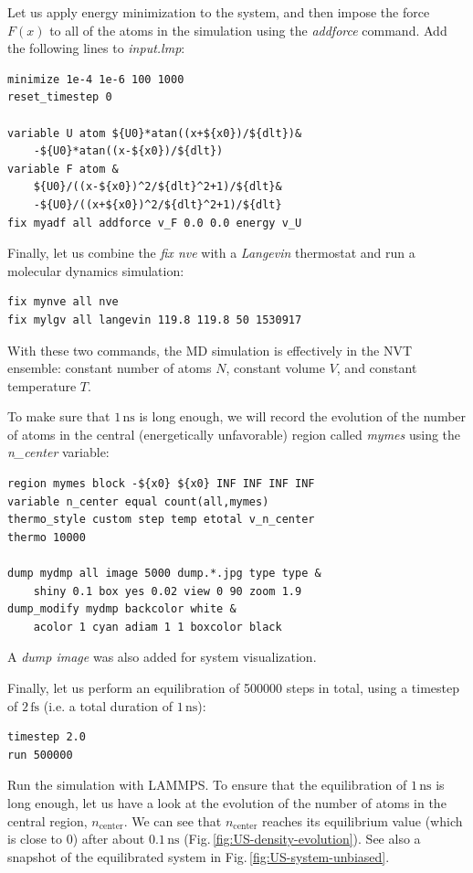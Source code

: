\documentclass[9pt,tutorial]{livecoms}
\begin{document}
Let us apply energy minimization to the system, and then impose the force $F(x)$
to all of the atoms in the simulation using the \textit{addforce} command. Add
the following lines to \textit{input.lmp}:
{\normalsize \begin{verbatim}
minimize 1e-4 1e-6 100 1000
reset_timestep 0

variable U atom ${U0}*atan((x+${x0})/${dlt})&
    -${U0}*atan((x-${x0})/${dlt})
variable F atom &
    ${U0}/((x-${x0})^2/${dlt}^2+1)/${dlt}&
    -${U0}/((x+${x0})^2/${dlt}^2+1)/${dlt}
fix myadf all addforce v_F 0.0 0.0 energy v_U
\end{verbatim}}
Finally, let us combine the \textit{fix nve} with a \textit{Langevin} thermostat
and run a molecular dynamics simulation:
{\normalsize \begin{verbatim}
fix mynve all nve
fix mylgv all langevin 119.8 119.8 50 1530917
\end{verbatim}}
With these two commands, the MD simulation
is effectively in the NVT ensemble: constant number of atoms $N$, constant volume
$V$, and constant temperature $T$.

To make sure that $1\,\text{ns}$ is long enough, we will record the evolution of
the number of atoms in the central (energetically unfavorable) region called \textit{mymes}
using the \textit{n\_center} variable:
{\normalsize \begin{verbatim}
region mymes block -${x0} ${x0} INF INF INF INF
variable n_center equal count(all,mymes)
thermo_style custom step temp etotal v_n_center
thermo 10000

dump mydmp all image 5000 dump.*.jpg type type &
    shiny 0.1 box yes 0.02 view 0 90 zoom 1.9
dump_modify mydmp backcolor white &
    acolor 1 cyan adiam 1 1 boxcolor black
\end{verbatim}}
A \textit{dump image} was also added for system visualization.

Finally, let us perform an equilibration of 500000 steps
in total, using a timestep of $2\,\text{fs}$ (i.e. a total duration of $1\,\text{ns}$):
{\normalsize \begin{verbatim}
timestep 2.0
run 500000
\end{verbatim}}
Run the simulation with LAMMPS. To ensure that the equilibration of $1\,\text{ns}$ is long
enough, let us have a look at the evolution of the number of atoms in the central region,
$n_\mathrm{center}$. We can see that $n_\mathrm{center}$ reaches
its equilibrium value (which is close to 0) after about $0.1\,\text{ns}$
(Fig.\,\ref{fig:US-density-evolution}). See also a snapshot of the equilibrated
system in Fig.\,\ref{fig:US-system-unbiased}.
\end{document}

